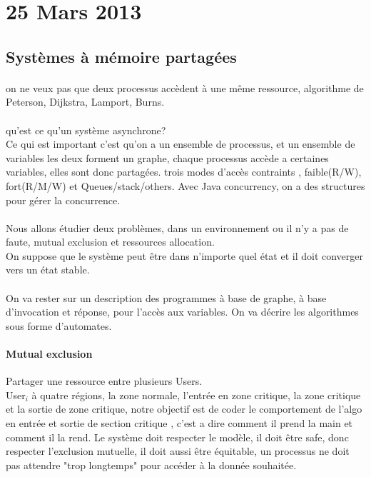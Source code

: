\documentclass{article}
\begin{document}
\section{25 Mars 2013}
\subsection{Systèmes à mémoire partagées} 
\paragraph{} on ne veux pas que deux processus accèdent à une même ressource, algorithme de Peterson, Dijkstra, Lamport, Burns. \\\\

qu'est ce qu'un système asynchrone?\\
Ce qui est important c'est qu'on a un ensemble de processus, et un ensemble de variables les deux forment un graphe, chaque processus accède a certaines variables, elles sont donc partagées. trois modes d’accès contraints , faible(R/W), fort(R/M/W) et Queues/stack/others. Avec Java concurrency, on a des structures pour gérer la concurrence.\\

\paragraph{} Nous allons étudier deux problèmes, dans un environnement ou il n'y a pas de faute, mutual exclusion et ressources allocation.\\ On suppose que le système peut être dans n'importe quel état et il doit converger vers un état stable. \\\\On va rester sur un description des programmes à base de graphe, à base d'invocation et réponse, pour l'accès aux variables. On va décrire les algorithmes sous forme d'automates.

\paragraph{Mutual exclusion} Partager une ressource entre plusieurs Users. \\User$_i$ à quatre régions, la zone normale, l'entrée en zone critique, la zone critique et la sortie de zone critique, notre objectif est de coder le comportement de l'algo en entrée et sortie de section critique , c'est a dire comment il prend la main et comment il la rend. Le système doit respecter le modèle, il doit être safe, donc respecter l'exclusion mutuelle, il doit aussi être équitable, un processus ne doit pas attendre "trop longtemps" pour accéder à la donnée souhaitée.
\end{document}
